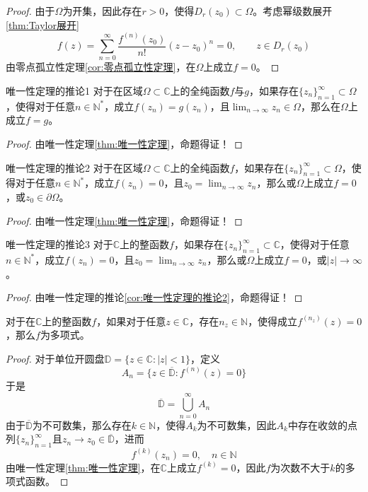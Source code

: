 \documentclass[lang = cn, scheme = chinese, thmcnt = section]{elegantbook}
\newcommand{\N}{\mathbb{N}}            %
\newcommand{\C}{\mathbb{C}}  		   %
\newcommand{\sub}{\subset}             %
\begin{document}
\begin{proof}
	由于$\Omega$为开集，因此存在$r>0$，使得$D_r(z_0)\sub\Omega$。考虑幂级数展开\ref{thm:Taylor展开}%
	$$
	f(z)=\sum_{n=0}^{\infty}\frac{f^{(n)}(z_0)}{n!}(z-z_0)^n=0,\qquad 
	z\in D_r(z_0)
	$$
	由零点孤立性定理\ref{cor:零点孤立性定理}，在$\Omega$上成立$f=0$。
\end{proof}

\begin{corollary}{}{唯一性定理的推论1}
	对于在区域$\Omega\sub\C$上的全纯函数$f$与$g$，如果存在$\{z_n\}_{n=1}^{\infty}\sub\Omega$，使得对于任意$n\in\N^*$，成立$f(z_n)=g(z_n)$，且$\displaystyle\lim_{n\to\infty}{z_n}\in\Omega$，那么在$\Omega$上成立$f=g$。
\end{corollary}

\begin{proof}
	由唯一性定理\ref{thm:唯一性定理}，命题得证！
\end{proof}

\begin{corollary}{}{唯一性定理的推论2}
	对于在区域$\Omega\sub\C$上的全纯函数$f$，如果存在$\{z_n\}_{n=1}^{\infty}\sub\Omega$，使得对于任意$n\in\N^*$，成立$f(z_n)=0$，且$\displaystyle z_0=\lim_{n\to\infty}{z_n}$，那么或$\Omega$上成立$f=0$，或$z_0\in\partial\Omega$。
\end{corollary}

\begin{proof}
	由唯一性定理\ref{thm:唯一性定理}，命题得证！
\end{proof}

\begin{corollary}{}{唯一性定理的推论3}
	对于$\C$上的整函数$f$，如果存在$\{z_n\}_{n=1}^{\infty}\sub\C$，使得对于任意$n\in\N^*$，成立$f(z_n)=0$，且$\displaystyle z_0=\lim_{n\to\infty}{z_n}$，那么或$\Omega$上成立$f=0$，或$|z|\to\infty$。
\end{corollary}

\begin{proof}
	由唯一性定理的推论\ref{cor:唯一性定理的推论2}，命题得证！
\end{proof}

\begin{proposition}
	对于在$\C$上的整函数$f$，如果对于任意$z\in\C$，存在$n_z\in\N$，使得成立$f^{(n_z)}(z)=0$，那么$f$为多项式。
\end{proposition}

\begin{proof}
	对于单位开圆盘$\mathbb{D}=\{ z\in\C:|z|<1 \}$，定义
	$$
	A_n=\{ z\in\overline{\mathbb{D}}:f^{(n)}(z)=0 \}
	$$
	于是
	$$
	\overline{\mathbb{D}}=\bigcup_{n=0}^{\infty}{A_n}
	$$
	由于$\overline{\mathbb{D}}$为不可数集，那么存在$k\in\N$，使得$A_k$为不可数集，因此$A_k$中存在收敛的点列$\{z_n\}_{n=1}^{\infty}$且$z_n\to z_0\in\overline{\mathbb{D}}$，进而
	$$
	f^{(k)}(z_n)=0,\quad n\in\N
	$$
	由唯一性定理\ref{thm:唯一性定理}，在$\C$上成立$f^{(k)}=0$，因此$f$为次数不大于$k$的多项式函数。
\end{proof}
\end{document}
